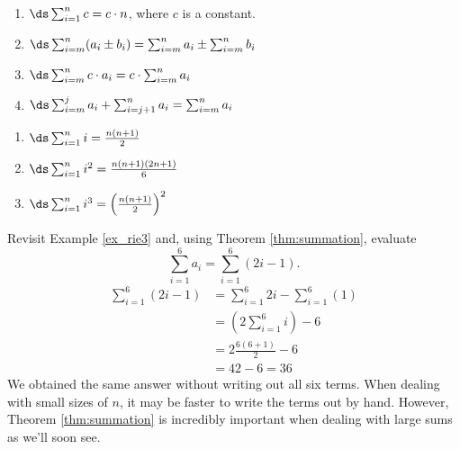 \setboxwidth{75pt}
{\noindent\begin{minipage}[t]{200pt}
\begin{enumerate}
		\item		$\ds \sum_{i=1}^n c = c\cdot n$, where $c$ is a constant.
		\item		$\ds \sum_{i=m}^n (a_i\pm b_i) = \sum_{i=m}^n a_i \pm \sum_{i=m}^n b_i$
		\item		$\ds \sum_{i=m}^n c\cdot a_i = c\cdot\sum_{i=m}^n a_i$
		\item		$\ds \sum_{i=m}^j a_i + \sum_{i=j+1}^n  a_i = \sum_{i=m}^n a_i$
	\end{enumerate}
\end{minipage}
\begin{minipage}[t]{200pt}
\begin{enumerate}\addtocounter{enumi}{4}
		\item		$\ds \sum_{i=1}^n i = \frac{n(n+1)}2$
		\item		$\ds \sum_{i=1}^n i^2 = \frac{n(n+1)(2n+1)}6$
		\item		$\ds \sum_{i=1}^n i^3 = \left(\frac{n(n+1)}2\right)^2$
	\end{enumerate}
\end{minipage}
}
\restoreboxwidth

{Revisit Example \ref{ex_rie3} and, using Theorem \ref{thm:summation}, evaluate $$\sum_{i=1}^6 a_i = \sum_{i=1}^6 (2i-1).$$
}
{\begin{align*}
		\sum_{i=1}^6 (2i-1) & = \sum_{i=1}^6 2i - \sum_{i=1}^6 (1)\\
												&=	\left(2\sum_{i=1}^6 i \right)- 6 \\
												&= 2\frac{6(6+1)}{2} - 6 \\
												&= 42-6 = 36
 \end{align*}
 We obtained the same answer without writing out all six terms. When dealing with small sizes of $n$, it may be faster to write the terms out by hand. However, Theorem \ref{thm:summation} is incredibly important when dealing with large sums as we'll soon see.
 }\\
 

